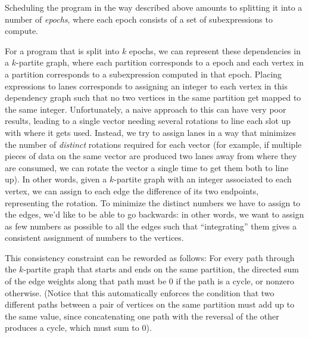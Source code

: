 Scheduling the program in the way described above amounts to splitting it into a number of {\em epochs}, where each epoch consists of a set of subexpressions to compute. 

For a program that is split into $k$ epochs, we can represent these dependencies in a $k$-partite graph, where each partition corresponds to a epoch and each vertex in a partition corresponds to a subexpression computed in that epoch.
Placing expressions to lanes corresponds to assigning an integer to each vertex in this dependency graph such that no two vertices in the same partition get mapped to the same integer.
Unfortunately, a naive approach to this can have very poor results, leading to a single vector needing several rotations to line each slot up with where it gets used.
Instead, we try to assign lanes in a way that minimizes the number of {\em distinct} rotations required for each vector (for example, if multiple pieces of data on the same vector are produced two lanes away from where they are consumed, we can rotate the vector a single time to get them both to line up).
In other words, given a $k$-partite graph with an integer associated to each vertex, we can assign to each edge the difference of its two endpoints, representing the rotation. 
To minimize the distinct numbers we have to assign to the edges, we'd like to be able to go backwards: in other words, we want to assign as few numbers as possible to all the edges such that ``integrating'' them gives a consistent assignment of numbers to the vertices.

This consistency constraint can be reworded as follows: For every path through the $k$-partite graph that starts and ends on the same partition, the directed sum of the edge weights along that path must be 0 if the path is a cycle, or nonzero otherwise.
(Notice that this automatically enforces the condition that two different paths between a pair of vertices on the same partition must add up to the same value, since concatenating one path with the reversal of the other produces a cycle, which must sum to 0).

